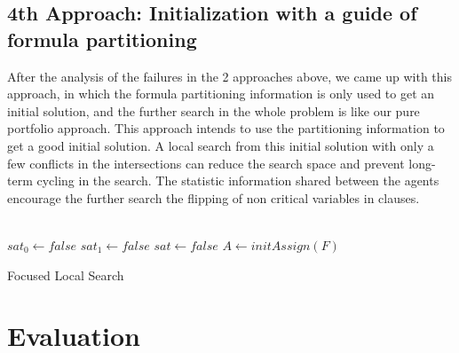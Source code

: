 \documentclass[12pt,a4paper,twoside]{scrartcl}
\numberwithin{equation}{section}
\begin{document}
\subsection{4th Approach: Initialization with a guide of formula partitioning}
After the analysis of the failures in the 2 approaches above, we came up with this approach, in which the formula partitioning information is only used to get an initial solution, and the further search in the whole problem is like our pure portfolio approach. This approach intends to use the partitioning information to get a good initial solution.  A local search from this initial solution with only a few conflicts in the intersections can reduce the search space and prevent long-term cycling in the search. The statistic information shared between the agents encourage the further search the flipping of non critical variables in clauses. \\
\\
\begin{algorithm}[H]
  $sat_0 \leftarrow false$\;
  $sat_1 \leftarrow false$\;
  $sat \leftarrow false$\;
  $A \leftarrow initAssign(F)$\;
 \caption{Focused Local Search}
\end{algorithm}  



\clearpage
\section{Evaluation} 
\label{sec:eva}
\end{document}
